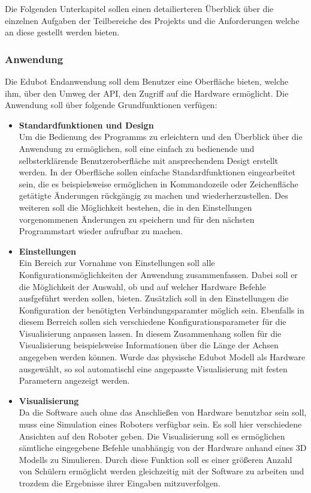 Die Folgenden Unterkapitel sollen einen detailierteren Überblick über die einzelnen Aufgaben der Teilbereiche des Projekts und die Anforderungen welche an diese gestellt werden bieten.
\subsubsection{Anwendung}
Die Edubot Endanwendung soll dem Benutzer eine Oberfläche bieten, welche ihm, über den Umweg der API, den Zugriff auf die Hardware ermöglicht. Die Anwendung soll über folgende Grundfunktionen verfügen:
\begin{itemize}
\item \textbf{Standardfunktionen und Design}\\
Um die Bedienung des Programms zu erleichtern und den Überblick über die Anwendung zu ermöglichen, soll eine einfach zu bedienende und selbsterklärende Benutzeroberfläche mit ansprechendem Desigt erstellt werden. In der Oberfläche sollen einfache Standardfunktionen eingearbeitet sein, die es beispielsweise ermöglichen in Kommandozeile oder Zeichenfläche getätigte Änderungen rückgängig zu machen und wiederherzustellen. Des weiteren soll die Möglichkeit bestehen, die in den Einstellungen vorgenommenen Änderungen zu speichern und für den nächsten Programmstart wieder aufrufbar zu machen.
\item \textbf{Einstellungen}\\
Ein Bereich zur Vornahme von Einstellungen soll alle Konfigurationsmöglichkeiten der Anwendung zusammenfassen. Dabei soll er die Möglichkeit der Auswahl, ob und auf welcher Hardware Befehle ausfgeführt werden sollen, bieten. Zusätzlich soll in den Einstellungen die Konfiguration der benötigten Verbindungsparamter möglich sein. Ebenfalls in diesem Berreich sollen sich verschiedene Konfigurationsparameter für die Visualisierung anpassen lassen. In diesem Zusammenhang sollen für die Visualisierung beispielsweise Informationen über die Länge der Achsen angegeben werden können. Wurde das physische Edubot Modell als Hardware ausgewählt, so sol automatischl eine angepasste Visualisierung mit festen Parametern angezeigt werden.
\item \textbf{Visualisierung}\\
Da die Software auch ohne das Anschließen von Hardware benutzbar sein soll, muss eine Simulation eines Roboters verfügbar sein. Es soll hier verschiedene Ansichten auf den Roboter geben. Die Visualisierung soll es ermöglichen sämtliche eingegebene Befehle unabhängig von der Hardware anhand eines 3D Modells zu Simulieren. Durch diese Funktion soll es einer größeren Anzahl von Schülern ermöglicht werden gleichzeitig mit der Software zu arbeiten und trozdem die Ergebnisse ihrer Eingaben mitzuverfolgen.

\end{itemize}
